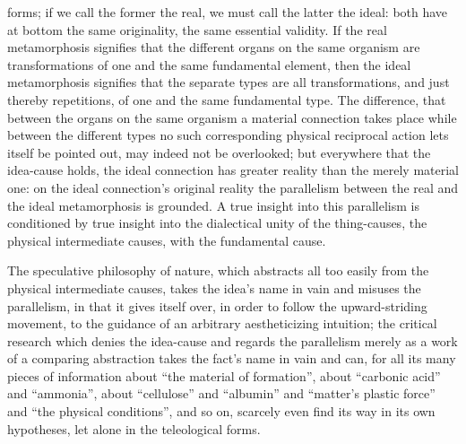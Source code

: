 \documentclass[12pt,a4paper]{book}
\begin{document}
forms; if we call the former the real, we must call the latter the ideal: both have
at bottom the same originality, the same essential validity. If the real
metamorphosis signifies that the different organs on the same organism are
transformations of one and the same fundamental element, then the ideal
metamorphosis signifies that the separate types are all transformations, and just
thereby repetitions, of one and the same fundamental type. The difference, that
between the organs on the same organism a material connection takes place while
between the different types no such corresponding physical reciprocal action lets
itself be pointed out, may indeed not be overlooked; but everywhere that the
idea-cause holds, the ideal connection has greater reality than the merely material
one: on the ideal connection's original reality the parallelism between the real and
the ideal metamorphosis is grounded. A true insight into this parallelism is
conditioned by true insight into the dialectical unity of the thing-causes, the
physical intermediate causes, with the fundamental cause.

The speculative philosophy of nature, which abstracts all too easily from the
physical intermediate causes, takes the idea's name in vain and misuses the
parallelism, in that it gives itself over, in order to follow the upward-striding
movement, to the guidance of an arbitrary aestheticizing intuition; the critical
research which denies the idea-cause and regards the parallelism merely as a work
of a comparing abstraction takes the fact's name in vain and can, for all its many
pieces of information about ``the material of formation'', about ``carbonic acid''
and ``ammonia'', about ``cellulose'' and ``albumin'' and ``matter's plastic force''
and ``the physical conditions'', and so on, scarcely even find its way in its own
hypotheses, let alone in the teleological forms.
\end{document}
